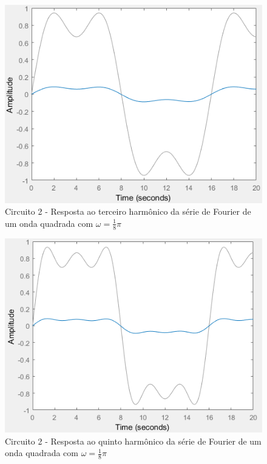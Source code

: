 \documentclass[a4paper, 12pt]{article}
\begin{document}
			\begin{figure}[!ht]
				\centering
				\includegraphics[scale=0.71]{img/1k_circ2.png}
				\caption{Circuito 2 - Resposta ao terceiro harmônico da série de Fourier de um onda quadrada com $\omega = \frac{1}{8}\pi$}
			\end{figure}
			\begin{figure}[!ht]
				\centering
				\includegraphics[scale=0.71]{img/1l_circ2.png}
				\caption{Circuito 2 - Resposta ao quinto harmônico da série de Fourier de um onda quadrada com $\omega = \frac{1}{8}\pi$}
			\end{figure}
		    \clearpage
\end{document}
